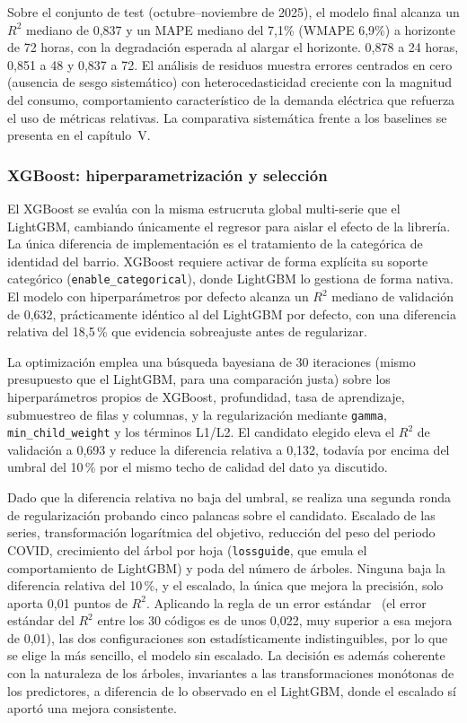\documentclass[12pt, a4paper]{article}
\begin{document}
Sobre el conjunto de test (octubre--noviembre de 2025), el modelo final alcanza un $R^2$ mediano de 0,837 y un MAPE mediano del 7,1\% (WMAPE 6,9\%) a horizonte de 72 horas, con la degradación esperada al alargar el horizonte. 0,878 a 24 horas, 0,851 a 48 y 0,837 a 72. El análisis de residuos muestra errores centrados en cero (ausencia de sesgo sistemático) con heterocedasticidad creciente con la magnitud del consumo, comportamiento característico de la demanda eléctrica que refuerza el uso de métricas relativas. La comparativa sistemática frente a los baselines se presenta en el capítulo~V.

\subsubsection{XGBoost: hiperparametrización y selección}

El XGBoost se evalúa con la misma estrucruta global multi-serie que el LightGBM, cambiando únicamente el regresor para aislar el efecto de la librería. La única diferencia de implementación es el tratamiento de la categórica de identidad del barrio. XGBoost requiere activar de forma explícita su soporte categórico (\texttt{enable\_categorical}), donde LightGBM lo gestiona de forma nativa. El modelo con hiperparámetros por defecto alcanza un $R^2$ mediano de validación de 0,632, prácticamente idéntico al del LightGBM por defecto, con una diferencia relativa del 18,5\,\% que evidencia sobreajuste antes de regularizar.

La optimización emplea una búsqueda bayesiana de 30 iteraciones (mismo presupuesto que el LightGBM, para una comparación justa) sobre los hiperparámetros propios de XGBoost, profundidad, tasa de aprendizaje, submuestreo de filas y columnas, y la regularización mediante \texttt{gamma}, \texttt{min\_child\_weight} y los términos L1/L2. El candidato elegido eleva el $R^2$ de validación a 0,693 y reduce la diferencia relativa a 0,132, todavía por encima del umbral del 10\,\% por el mismo techo de calidad del dato ya discutido.

Dado que la diferencia relativa no baja del umbral, se realiza una segunda ronda de regularización probando cinco palancas sobre el candidato. Escalado de las series, transformación logarítmica del objetivo, reducción del peso del periodo COVID, crecimiento del árbol por hoja (\texttt{lossguide}, que emula el comportamiento de LightGBM) y poda del número de árboles. Ninguna baja la diferencia relativa del 10\,\%, y el escalado, la única que mejora la precisión, solo aporta 0,01 puntos de $R^2$. Aplicando la regla de un error estándar~\cite{hastie2009} (el error estándar del $R^2$ entre los 30 códigos es de unos 0,022, muy superior a esa mejora de 0,01), las dos configuraciones son estadísticamente indistinguibles, por lo que se elige la más sencillo, el modelo sin escalado. La decisión es además coherente con la naturaleza de los árboles, invariantes a las transformaciones monótonas de los predictores, a diferencia de lo observado en el LightGBM, donde el escalado sí aportó una mejora consistente.
\end{document}
